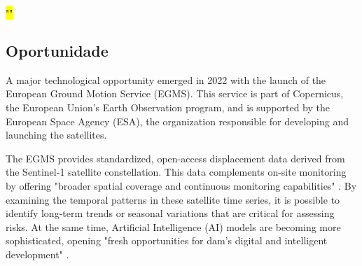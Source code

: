 \documentclass[11pt,a4paper]{article}
\begin{document}
\hl{\mbox{\parencite{marchamalo-sacristan2023}} ""}


\subsection{Oportunidade}

A major technological opportunity emerged in 2022 with the launch of the European Ground Motion Service (EGMS). This service is part of Copernicus, the European Union's Earth Observation program, and is supported by the European Space Agency (ESA), the organization responsible for developing and launching the satellites.

The EGMS provides standardized, open-access displacement data derived from the Sentinel-1 satellite constellation. This data complements on-site monitoring by offering "broader spatial coverage and continuous monitoring capabilities" \parencite{ruiz-armenteros2023}. By examining the temporal patterns in these satellite time series, it is possible to identify long-term trends or seasonal variations that are critical for assessing risks. At the same time, Artificial Intelligence (AI) models are becoming more sophisticated, opening "fresh opportunities for dam’s digital and intelligent development" \parencite{cao2025}.
\end{document}
